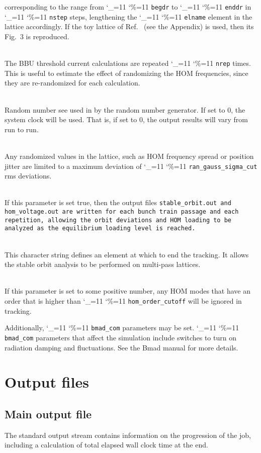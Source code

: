 \documentclass[11pt]{article}
\newcommand\ttcmd{\begingroup\catcode`\_=11 \catcode`\%=11 \dottcmd}
\newcommand\dottcmd[1]{\texttt{#1}\endgroup}
\newcommand{\vn}{\ttcmd}
\newcommand{\Newline}{\hfil \\}
\begin{document}
{\begin{description}
corresponding to the range from \vn{begdr} to \vn{enddr} in  \vn{nstep} steps,
lengthening the \vn{elname} element in the lattice accordingly. If the toy lattice
of Ref.~\cite{ref:Hoffstaetter04} (see the Appendix) is used, then its Fig.~3 is reproduced.
  \item[\vn{nrep}] \Newline
The BBU threshold current calculations are repeated \vn{nrep} times. This is useful
to estimate the effect of randomizing the HOM frequencies, since they are re-randomized for
each calculation.
  \item[\vn{ran_seed}] \Newline
Random number see used in by the random number generator. If set to 0, the system clock
will be used. That is, if set to 0, the output results will vary from run to run. 
  \item[\vn{ran_gauss_sigma_cut}] \Newline
Any randomized values in the lattice, such as HOM frequency spread or position jitter
are limited to a maximum deviation of \vn{ran_gauss_sigma_cut} rms deviations. 
  \item[\vn{stable_orbit_anal}] \Newline
If this parameter is set true, then the output files \tt{stable_orbit.out} and \tt{hom_voltage.out}
are written for each bunch train passage and each repetition, allowing the orbit deviations
and HOM loading to be analyzed as the equilibrium loading level is reached.
  \item[\vn{ele_track_end}] \Newline
This character string defines an element at which to end the tracking. It allows the stable orbit analysis to be performed on multi-pass lattices.
  \item[\vn{hom_order_cutoff}] \Newline
If this parameter is set to some positive number, any HOM modes that have an order that
is higher than \vn{hom_order_cutoff} will be ignored in tracking.
\end{description}

Additionally, \vn{bmad_com} parameters may be set. \vn{bmad_com}
parameters that affect the simulation include switches to turn on
radiation damping and fluctuations. See the Bmad\cite{ref:bmad} manual
for more details.

\section{Output files} 

\subsection{Main output file}
The standard output stream contains information on the progression of the job,
including a calculation of total elapsed wall clock time at the end.
}
\end{document}
